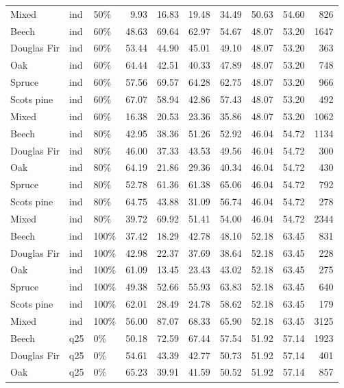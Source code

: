 \begin{longtable}{lllrrrrrrr}
  Mixed & ind & 50\% & 9.93 & 16.83 & 19.48 & 34.49 & 50.63 & 54.60 & 826 \\ 
  Beech & ind & 60\% & 48.63 & 69.64 & 62.97 & 54.67 & 48.07 & 53.20 & 1647 \\ 
  Douglas Fir & ind & 60\% & 53.44 & 44.90 & 45.01 & 49.10 & 48.07 & 53.20 & 363 \\ 
  Oak & ind & 60\% & 64.44 & 42.51 & 40.33 & 47.89 & 48.07 & 53.20 & 748 \\ 
  Spruce & ind & 60\% & 57.56 & 69.57 & 64.28 & 62.75 & 48.07 & 53.20 & 966 \\ 
  Scots pine & ind & 60\% & 67.07 & 58.94 & 42.86 & 57.43 & 48.07 & 53.20 & 492 \\ 
  Mixed & ind & 60\% & 16.38 & 20.53 & 23.36 & 35.86 & 48.07 & 53.20 & 1062 \\ 
  Beech & ind & 80\% & 42.95 & 38.36 & 51.26 & 52.92 & 46.04 & 54.72 & 1134 \\ 
  Douglas Fir & ind & 80\% & 46.00 & 37.33 & 43.53 & 49.56 & 46.04 & 54.72 & 300 \\ 
  Oak & ind & 80\% & 64.19 & 21.86 & 29.36 & 40.34 & 46.04 & 54.72 & 430 \\ 
  Spruce & ind & 80\% & 52.78 & 61.36 & 61.38 & 65.06 & 46.04 & 54.72 & 792 \\ 
  Scots pine & ind & 80\% & 64.75 & 43.88 & 31.09 & 56.74 & 46.04 & 54.72 & 278 \\ 
  Mixed & ind & 80\% & 39.72 & 69.92 & 51.41 & 54.00 & 46.04 & 54.72 & 2344 \\ 
  Beech & ind & 100\% & 37.42 & 18.29 & 42.78 & 48.10 & 52.18 & 63.45 & 831 \\ 
  Douglas Fir & ind & 100\% & 42.98 & 22.37 & 37.69 & 38.64 & 52.18 & 63.45 & 228 \\ 
  Oak & ind & 100\% & 61.09 & 13.45 & 23.43 & 43.02 & 52.18 & 63.45 & 275 \\ 
  Spruce & ind & 100\% & 49.38 & 52.66 & 55.93 & 63.83 & 52.18 & 63.45 & 640 \\ 
  Scots pine & ind & 100\% & 62.01 & 28.49 & 24.78 & 58.62 & 52.18 & 63.45 & 179 \\ 
  Mixed & ind & 100\% & 56.00 & 87.07 & 68.33 & 65.90 & 52.18 & 63.45 & 3125 \\ 
  Beech & q25 & 0\% & 50.18 & 72.59 & 67.44 & 57.54 & 51.92 & 57.14 & 1923 \\ 
  Douglas Fir & q25 & 0\% & 54.61 & 43.39 & 42.77 & 50.73 & 51.92 & 57.14 & 401 \\ 
  Oak & q25 & 0\% & 65.23 & 39.91 & 41.59 & 50.52 & 51.92 & 57.14 & 857 \\ 

\end{longtable}
